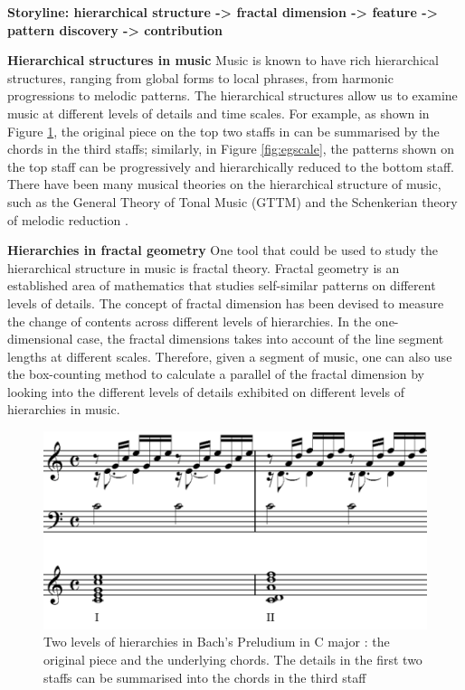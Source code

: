 

\textbf{Storyline: hierarchical structure -> fractal dimension -> feature -> pattern discovery -> contribution }

\textbf{Hierarchical structures in music}
Music is known to have rich hierarchical structures, ranging from global forms to local phrases, from harmonic progressions to melodic patterns. 
The hierarchical structures allow us to examine music at different levels of details and time scales. For example, as shown in Figure \ref{fig:egbach}, the original piece on the top two staffs in can be summarised by the chords in the third staffs; similarly, in Figure \ref{fig:egscale}, the patterns shown on the top staff can be progressively and hierarchically reduced to the bottom staff. 
There have been many musical theories on the hierarchical structure of music, such as the General Theory of Tonal Music (GTTM) \cite{lerdahl1985generative} and the Schenkerian theory of melodic reduction \cite{forte1959schenker}.

\textbf{Hierarchies in fractal geometry}
One tool that could be used to study the hierarchical structure in music is fractal theory.
Fractal geometry is an established area of mathematics that studies self-similar patterns on different levels of details.
The concept of fractal dimension has been devised to measure the change of contents across different levels of hierarchies.
In the one-dimensional case, the fractal dimensions takes into account of the line segment lengths at different scales.
Therefore, given a segment of music, one can also use the box-counting method to calculate a parallel of the fractal dimension by looking into the different levels of details exhibited on different levels of hierarchies in music.
\begin{figure}
  \includegraphics[width=\linewidth]{src/img/eg.png}
  \caption{Two levels of hierarchies in Bach's Preludium in C major \cite{wiki:bach}: the original piece and the underlying chords.
          The details in the first two staffs can be summarised into the chords in the third staff}
  \label{fig:egbach}
\end{figure}

